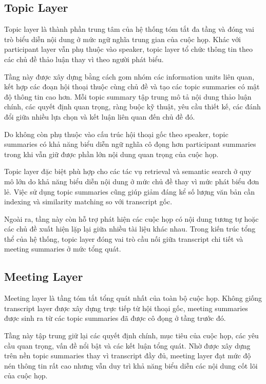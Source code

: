 \subsection{Topic Layer}

Topic layer là thành phần trung tâm của hệ thống tóm tắt đa tầng và đóng vai trò biểu diễn nội dung ở mức ngữ nghĩa trung gian của cuộc họp. Khác với participant layer vẫn phụ thuộc vào speaker, topic layer tổ chức thông tin theo các chủ đề thảo luận thay vì theo người phát biểu.

Tầng này được xây dựng bằng cách gom nhóm các information units liên quan, kết hợp các đoạn hội thoại thuộc cùng chủ đề và tạo các topic summaries có mật độ thông tin cao hơn. Mỗi topic summary tập trung mô tả nội dung thảo luận chính, các quyết định quan trọng, ràng buộc kỹ thuật, yêu cầu thiết kế, các đánh đổi giữa nhiều lựa chọn và kết luận liên quan đến chủ đề đó.

Do không còn phụ thuộc vào cấu trúc hội thoại gốc theo speaker, topic summaries có khả năng biểu diễn ngữ nghĩa cô đọng hơn participant summaries trong khi vẫn giữ được phần lớn nội dung quan trọng của cuộc họp.

Topic layer đặc biệt phù hợp cho các tác vụ retrieval và semantic search ở quy mô lớn do khả năng biểu diễn nội dung ở mức chủ đề thay vì mức phát biểu đơn lẻ. Việc sử dụng topic summaries cũng giúp giảm đáng kể số lượng văn bản cần indexing và similarity matching so với transcript gốc.

Ngoài ra, tầng này còn hỗ trợ phát hiện các cuộc họp có nội dung tương tự hoặc các chủ đề xuất hiện lặp lại giữa nhiều tài liệu khác nhau. Trong kiến trúc tổng thể của hệ thống, topic layer đóng vai trò cầu nối giữa transcript chi tiết và meeting summaries ở mức tổng quát.

\subsection{Meeting Layer}

Meeting layer là tầng tóm tắt tổng quát nhất của toàn bộ cuộc họp. Không giống transcript layer được xây dựng trực tiếp từ hội thoại gốc, meeting summaries được sinh ra từ các topic summaries đã được cô đọng ở tầng trước đó.

Tầng này tập trung giữ lại các quyết định chính, mục tiêu của cuộc họp, các yêu cầu quan trọng, vấn đề nổi bật và các kết luận tổng quát. Nhờ được xây dựng trên nền topic summaries thay vì transcript đầy đủ, meeting layer đạt mức độ nén thông tin rất cao nhưng vẫn duy trì khả năng biểu diễn các nội dung cốt lõi của cuộc họp.

